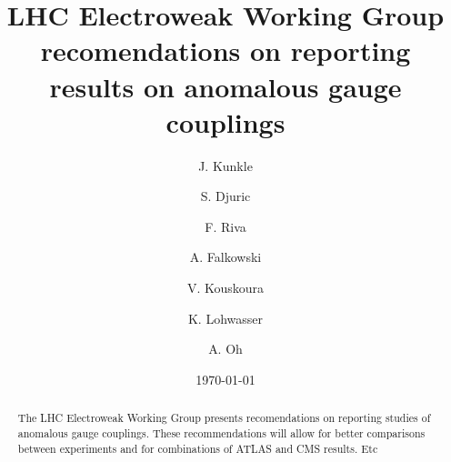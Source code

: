 \documentclass[aps,prl,preprint,groupedaddress]{revtex4-1}
\begin{document}
\title{LHC Electroweak Working Group recomendations on reporting results on anomalous gauge couplings}


\author{J. Kunkle}
\author{S. Djuric}
\affiliation{}
\author{F. Riva}
\affiliation{}
\author{A. Falkowski}
\affiliation{}
\author{V. Kouskoura}
\affiliation{}
\author{K. Lohwasser}
\affiliation{}
\author{A. Oh}
\affiliation{}



\date{\today}

\begin{abstract}
The LHC Electroweak Working Group presents recomendations on 
reporting studies of anomalous gauge couplings.  
These recommendations will allow for better comparisons
between experiments and for combinations of ATLAS and CMS results.
Etc

\end{abstract}

\pacs{}

\maketitle
















\end{document}
